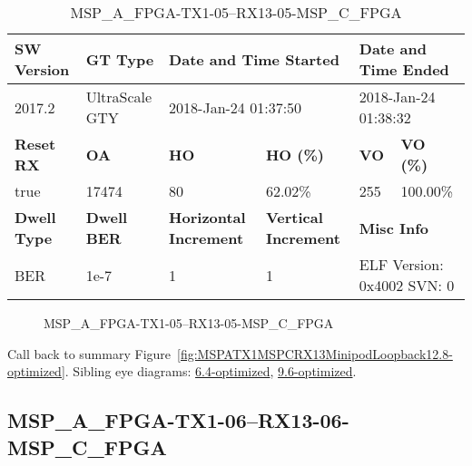 \begin{table}[h]
\centering
\caption{MSP\_A\_FPGA-TX1-05--RX13-05-MSP\_C\_FPGA}
\label{tab:MSPAFPGATX105RX1305MSPCFPGA12.8-optimized}
\begin{tabular}{@{}|l|l|l|l|l|l|@{}}
\toprule
\textbf{SW Version}                & \textbf{GT Type}   & \multicolumn{2}{l|}{\textbf{Date and Time Started}}            & \multicolumn{2}{l|}{\textbf{Date and Time Ended}}        \\ \midrule
2017.2                       & UltraScale GTY          & \multicolumn{2}{l|}{2018-Jan-24 01:37:50}                   & \multicolumn{2}{l|}{2018-Jan-24 01:38:32}               \\ \midrule
\textbf{Reset RX}                  & \textbf{OA} & \textbf{HO}   & \textbf{HO (\%)} & \textbf{VO} & \textbf{VO (\%)} \\ \midrule
true & 17474        & 80          & 62.02\%        & 255        & 100.00\%       \\ \midrule
\textbf{Dwell Type}                & \textbf{Dwell BER} & \textbf{Horizontal Increment} & \textbf{Vertical Increment}    & \multicolumn{2}{l|}{\textbf{Misc Info}}                  \\ \midrule
BER                            & 1e-7        & 1        & 1           & \multicolumn{2}{l|}{ELF Version: 0x4002 SVN: 0}                         \\ \bottomrule
\end{tabular}
\end{table}

\begin{figure}[h]
\caption{MSP\_A\_FPGA-TX1-05--RX13-05-MSP\_C\_FPGA} \label{fig:MSPAFPGATX105RX1305MSPCFPGA12.8-optimized}
\end{figure}

Call back to summary Figure~\ref{fig:MSPATX1MSPCRX13MinipodLoopback12.8-optimized}.
Sibling eye diagrams: \hyperref[sec:MSPAFPGATX105RX1305MSPCFPGA6.4-optimized]{6.4-optimized}, \hyperref[sec:MSPAFPGATX105RX1305MSPCFPGA9.6-optimized]{9.6-optimized}.

\clearpage
\newpage


\subsection{MSP\_A\_FPGA-TX1-06--RX13-06-MSP\_C\_FPGA}\label{sec:MSPAFPGATX106RX1306MSPCFPGA12.8-optimized}

